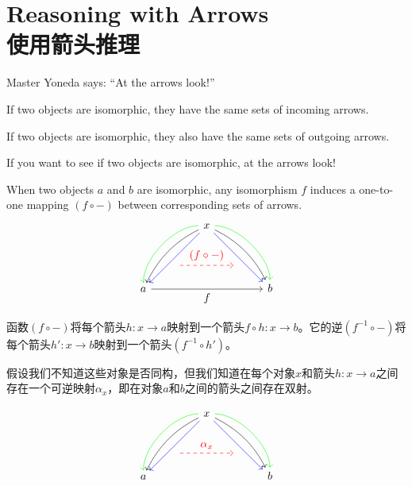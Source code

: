 \documentclass[DaoFP]{subfiles}
\begin{document}
 \section{Reasoning with Arrows\\使用箭头推理}

 Master Yoneda says: ``At the arrows look!''

 If two objects are isomorphic, they have the same sets of incoming arrows.

 If two objects are isomorphic, they also have the same sets of outgoing arrows.

 If you want to see if two objects are isomorphic, at the arrows look!

 \medskip

 When two objects $a$ and $b$ are isomorphic, any isomorphism $f$ induces a one-to-one mapping $(f \circ -)$ between corresponding sets of arrows.
 \[
  \begin{tikzcd}
   \node(x) at (0, 2) {x};
   \node(a) at (-2, 0) {a};
   \node(b) at (2, 0) {b};
   \node(c1) at (-1, 1.5) {};
   \node(c2) at (-1.5, 1) {};
   \node(c3) at (-1, 2) {};
   \node(c4) at (-2, 1) {};
   \node(d1) at (1, 1.5) {};
   \node(d2) at (1.5, 1) {};
   \node(d3) at (1, 2) {};
   \node(d4) at (2, 1) {};
   \node (aa) at (-1, 0.75) {};
   \node (bb) at (1, 0.75) {};
   \draw[->] (x) .. controls (c1)  and (c2) .. (a); %
   \draw[->, green] (x) .. controls (c3)  and (c4) .. (a); %
   \draw[->, blue] (x) -- (a);
   \draw[->] (x) .. controls (d1)  and (d2) .. (b); %
   \draw[->, green] (x) .. controls (d3)  and (d4) .. (b); %
   \draw[->, blue] (x) -- (b);
   \draw[->, red, dashed] (aa) -- node[above]{(f \circ -)} (bb);
   \draw[->] (a) -- node[below]{f} (b);
  \end{tikzcd}
 \]

 函数$(f \circ -)$将每个箭头$h \colon x \to a$映射到一个箭头$f \circ h \colon x \to b$。它的逆$(f^{-1} \circ -)$将每个箭头$h' \colon x \to b$映射到一个箭头$(f^{-1} \circ h')$。

 假设我们不知道这些对象是否同构，但我们知道在每个对象$x$和箭头$h \colon x \to a$之间存在一个可逆映射$\alpha_x$，即在对象$a$和$b$之间的箭头之间存在双射。

 \[
  \begin{tikzcd}
   \node(x) at (0, 2) {x};
   \node(a) at (-2, 0) {a};
   \node(b) at (2, 0) {b};
   \node(c1) at (-1, 1.5) {};
   \node(c2) at (-1.5, 1) {};
   \node(c3) at (-1, 2) {};
   \node(c4) at (-2, 1) {};
   \node(d1) at (1, 1.5) {};
   \node(d2) at (1.5, 1) {};
   \node(d3) at (1, 2) {};
   \node(d4) at (2, 1) {};
   \node (aa) at (-1, 0.75) {};
   \node (bb) at (1, 0.75) {};
   \draw[->] (x) .. controls (c1)  and (c2) .. (a); %
   \draw[->, green] (x) .. controls (c3)  and (c4) .. (a); %
   \draw[->, blue] (x) -- (a);
   \draw[->] (x) .. controls (d1)  and (d2) .. (b); %
   \draw[->, green] (x) .. controls (d3)  and (d4) .. (b); %
   \draw[->, blue] (x) -- (b);
   \draw[->, red, dashed] (aa) -- node[above]{\alpha_x} (bb);
  \end{tikzcd}
 \]
\end{document}
